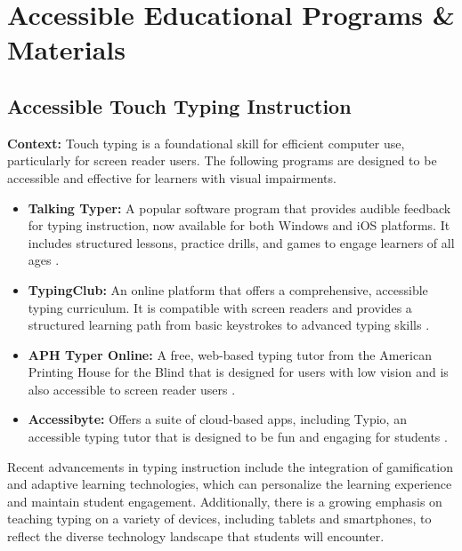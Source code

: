 \chapter{Accessible Educational Programs \& Materials}\label{app4:instructional-programs}

\section{Accessible Touch Typing Instruction}\label{app4:typing-instruction}

\noindent
\textbf{Context:} Touch typing is a foundational skill for efficient computer use, particularly for screen reader users. The following programs are designed to be accessible and effective for learners with visual impairments.

\begin{itemize}
	\item \textbf{Talking Typer:} A popular software program that provides audible feedback for typing instruction, now available for both Windows and iOS platforms. It includes structured lessons, practice drills, and games to engage learners of all ages \cite{TypeAbility2025}.
	\item \textbf{TypingClub:} An online platform that offers a comprehensive, accessible typing curriculum. It is compatible with screen readers and provides a structured learning path from basic keystrokes to advanced typing skills \cite{TypingClub2025}.
	\item \textbf{APH Typer Online:} A free, web-based typing tutor from the American Printing House for the Blind that is designed for users with low vision and is also accessible to screen reader users \cite{APH2025}.
	\item \textbf{Accessibyte:} Offers a suite of cloud-based apps, including Typio, an accessible typing tutor that is designed to be fun and engaging for students \cite{Typio2025}.
\end{itemize}

Recent advancements in typing instruction include the integration of gamification and adaptive learning technologies, which can personalize the learning experience and maintain student engagement. Additionally, there is a growing emphasis on teaching typing on a variety of devices, including tablets and smartphones, to reflect the diverse technology landscape that students will encounter.

